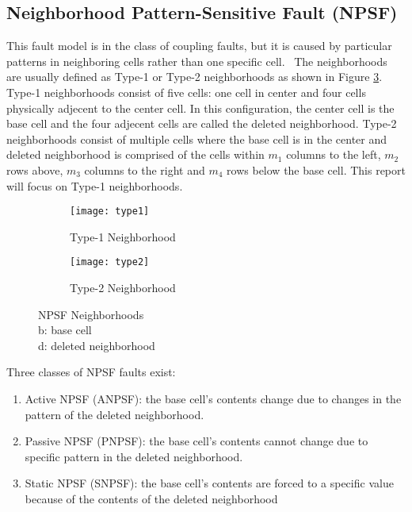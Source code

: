 \subsection{Neighborhood Pattern-Sensitive Fault (NPSF)}
\label{sec:npsf}
This fault model is in the class of coupling faults, but it is caused by particular patterns in neighboring cells rather than one specific cell.  The neighborhoods are usually defined as Type-1 or Type-2 neighborhoods \cite{1047051} as shown in Figure \ref{fig:npsftypes}.  Type-1 neighborhoods consist of five cells: one cell in center and four cells physically adjecent to the center cell.  In this configuration, the center cell is the base cell and the four adjecent cells are called the deleted neighborhood.  Type-2 neighborhoods consist of multiple cells where the base cell is in the center and deleted neighborhood is comprised of the cells within $m_1$ columns to the left, $m_2$ rows above, $m_3$ columns to the right and $m_4$ rows below the base cell.  This report will focus on Type-1 neighborhoods.

\begin{figure}[h!]
  \centering
  \begin{subfigure}[b]{0.4\textwidth}
    \texttt{[image: type1]}
    \caption{Type-1 Neighborhood}
    \label{fig:type1}
  \end{subfigure}
  \begin{subfigure}[b]{0.4\textwidth}
    \texttt{[image: type2]}
    \caption{Type-2 Neighborhood}
    \label{fig:type2}
  \end{subfigure}
  \caption{NPSF Neighborhoods \\
           b: base cell \\
           d: deleted neighborhood} 
  \label{fig:npsftypes}
\end{figure}

Three classes of NPSF faults exist:
\begin{enumerate}
  \item Active NPSF (ANPSF): the base cell's contents change due to changes in the pattern of the deleted neighborhood.
  \item Passive NPSF (PNPSF): the base cell's contents cannot change due to specific pattern in the deleted neighborhood.
  \item Static NPSF (SNPSF): the base cell's contents are forced to a specific value because of the contents of the deleted neighborhood
\end{enumerate}

